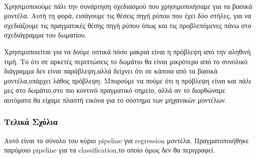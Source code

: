 \paragraph{\texttt{}}

Χρησιμοποιούμε πάλι την συνάρτηση σχεδιασμού που χρησιμοποιήσαμε για τα βασικά μοντέλα.
Αυτή τη φορά, εισάγουμε τις θέσεις πηγή ρύπου που έχει δύο στήλες,
για να σχεδιάζουμε τις πραγματικές θέσης πηγή ρύπου όπως και τις προβλεπόμενες πάνω στο σχεδιάγραμμα του δωματίου.

Χρησιμοποιείται για να δούμε οπτικά πόσο μακριά είναι η πρόβλεψη από την αληθινή τιμή.
Το ότι σε αρκετές περιπτώσεις το δωμάτιο θα είναι μικρότερο από το συνολικό διάγραμμα δεν είναι παράβλεψη,αλλά δείχνει ότι 
σε κάποια από τα βασικά μοντέλα,υπάρχει λάθος πρόβλεψη.
Μπορούμε να πούμε ότι η πρόβλεψη είναι και πάλι μες στο δωμάτιο,στο πιο κοντινό πραγματικό σημείο,
αλλά αν το διορθώναμε αυτόματα θα είχαμε πλαστή εικόνα για το σύστημα των μηχανικών μοντέλων.

\subsubsection{Τελικά Σχόλια}

Αυτό είναι το σύνολο του κύριο pipeline για regression μοντέλα.
Πραγματοποιήθηκε παρόμοιο pipeline για τα classification,το οποίο όμως δεν θα περιγραφεί.


